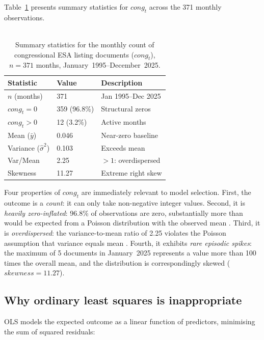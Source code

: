 \documentclass[11pt]{article}
\begin{document}
Table~\ref{tab:summary} presents summary statistics for $\mathit{cong}_t$ across the 371 monthly observations.\\
\\

\begin{table}[t]
  \centering
  \small
  \caption{Summary statistics for the monthly count of congressional
           ESA listing documents ($\mathit{cong}_t$),
           $n = 371$ months, January~1995--December~2025.}
  \label{tab:summary}
  \begin{tabular}{lll}
    \toprule
    Statistic & Value & Description \\
    \midrule
    $n$ (months) & 371 & Jan 1995--Dec 2025 \\
    $\mathit{cong}_t = 0$ & 359 (96.8\%) & Structural zeros \\
    $\mathit{cong}_t > 0$ & 12 (3.2\%) & Active months \\
    Mean ($\bar{y}$) & 0.046 & Near-zero baseline \\
    Variance ($\hat{\sigma}^2$) & 0.103 & Exceeds mean \\
    Var/Mean & 2.25 & $>1$: overdispersed \\
    Skewness & 11.27 & Extreme right skew \\
    \bottomrule
  \end{tabular}
\end{table}

Four properties of $\mathit{cong}_t$ are immediately relevant to model selection. First, the outcome is a \textit{count}: it can only take non-negative integer values. Second, it is \textit{heavily zero-inflated}: 96.8\% of observations are zero, substantially more than would be expected from a Poisson distribution with the observed mean \citep{Welsh2000, Mullahy1986}. Third, it is \textit{overdispersed}: the variance-to-mean ratio of 2.25 violates the Poisson assumption that variance equals mean \citep{Cameron1998}. Fourth, it exhibits
\textit{rare episodic spikes}: the maximum of 5 documents in January~2025 represents a value more than 100 times the overall mean, and the distribution is correspondingly skewed ($\mathit{skewness} =
11.27$).

\subsection{Why ordinary least squares is inappropriate}

OLS models the expected outcome as a linear function of predictors, minimising the sum of squared residuals:
\end{document}
